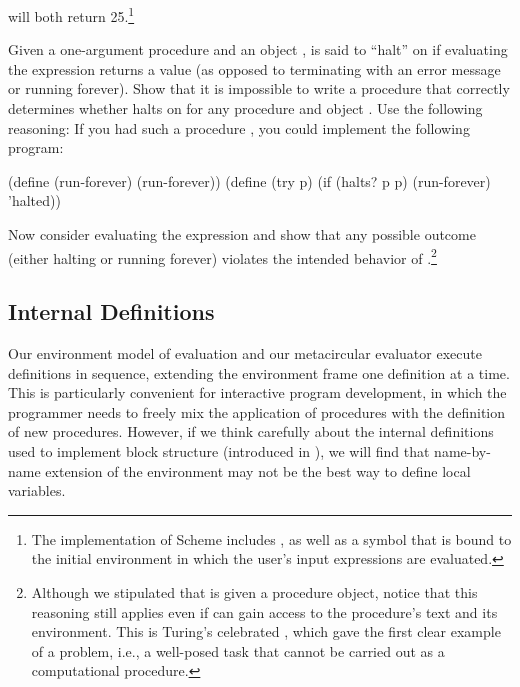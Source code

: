 \noindent
will both return 25.\footnote{The  implementation of Scheme
includes , as well as a symbol  that
is bound to the initial environment in which the user's input expressions are
evaluated.}

\begin{exerciseGroup}
\label{Exercise 4.15}
 Given a one-argument procedure
 and an object ,  is said to ``halt'' on  if
evaluating the expression  returns a value (as opposed to
terminating with an error message or running forever).  Show that it is
impossible to write a procedure  that correctly determines whether
 halts on  for any procedure  and object .  Use
the following reasoning: If you had such a procedure , you could
implement the following program:

\begin{codeBlock}
(define (run-forever) (run-forever))
(define (try p)
  (if (halts? p p) (run-forever) 'halted))
\end{codeBlock}

Now consider evaluating the expression  and show that any
possible outcome (either halting or running forever) violates the intended
behavior of .\footnote{Although we stipulated that 
is given a procedure object, notice that this reasoning still applies even if
 can gain access to the procedure's text and its environment.
This is Turing's celebrated , which gave the first
clear example of a  problem, i.e., a well-posed task
that cannot be carried out as a computational procedure.}
\end{exerciseGroup}

\subsection{Internal Definitions}
\label{Section 4.1.6}

Our environment model of evaluation and our metacircular evaluator execute
definitions in sequence, extending the environment frame one definition at a
time.  This is particularly convenient for interactive program development, in
which the programmer needs to freely mix the application of procedures with the
definition of new procedures.  However, if we think carefully about the
internal definitions used to implement block structure (introduced in
), we will find that name-by-name extension of the environment may
not be the best way to define local variables.

